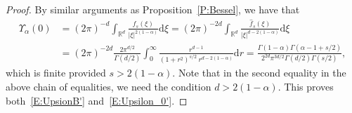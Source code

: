 \documentclass[a4paper,11pt]{article}%
\theoremstyle{plain}
\theoremstyle{definition}
\numberwithin{equation}{section}
\newcommand{\R}{\mathbb{R}}
\newcommand{\ud}{\ensuremath{\mathrm{d}}}
\begin{document}
\begin{proof}
  By similar arguments as Proposition~\ref{P:Bessel}, we have that
	\begin{align*}
     \Upsilon_{\alpha}(0)
     & = (2\pi)^{-d} \int_{\R^d} \frac{f_s(\xi)}{|\xi|^{2(1-\alpha)}} \ud \xi
       = (2\pi)^{-2d} \int_{\R^d} \frac{\widehat{f}_s(\xi)}{|\xi|^{d-2(1-\alpha)}} \ud \xi                                                               \\
     & = (2\pi)^{-2d} \frac{2 \pi^{d/2}}{\Gamma\left(d/2\right)} \int_0^\infty \frac{r^{d-1}}{ \left(1+r^2\right)^{s / 2} \: r^{d - 2(1-\alpha)} } \ud r
       = \frac{\Gamma\left(1 - \alpha\right) \Gamma\left(\alpha - 1 + s/2\right)}{2^{2d} \pi^{3d/2} \Gamma(d/2)\Gamma\left(s/2\right) },
	\end{align*}
  which is finite provided $s>2(1-\alpha)$. Note that in the second equality in the above chain of
  equalities, we need the condition $d>2(1-\alpha)$. This proves both~\eqref{E:UpsionB'}
  and~\eqref{E:Upsilon_0'}.


\end{proof}
\end{document}
